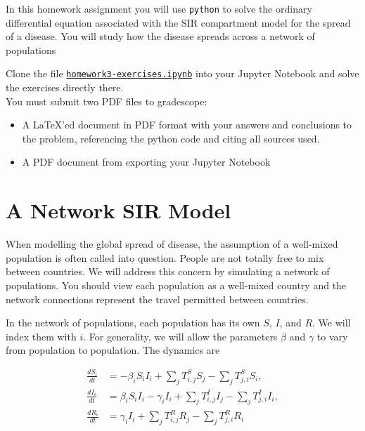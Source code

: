 \documentclass[letter]{article}
\newcommand{\setheader}[6]{
	\lhead{{\sc #1}\\{\sc #2}}%
	\rhead{
		{\bf #3} 
		\ifthenelse{\equal{#4}{}}{}{(#4)}\\
		{\bf #5} 
		\ifthenelse{\equal{#6}{}}{}{(#6)}%
	}
}
\begin{document}
	\setheader{APM348}{Homework 3}{Due: 5:59pm March 9}{}{}{}


In this homework assignment you will use \verb|python| to solve the ordinary differential equation associated with the SIR compartment model for the spread of a disease. You will study how the disease spreads across a network of populations

Clone the file \href{https://utoronto.syzygy.ca/jupyter/user-redirect/git-pull?repo=https://github.com/bigfatbernie/IBLMathModeling&subPath=homeworks/homework3/homework3-exercises.ipynb}{\tt homework3-exercises.ipynb} into your Jupyter Notebook and solve the exercises directly there. \\

You must submit two PDF files to gradescope:
\begin{itemize}
	\item A \LaTeX'ed document in PDF format with your answers and conclusions to the problem, referencing the python code and citing all sources used.
	\item A PDF document from exporting your Jupyter Notebook
\end{itemize}



\section{A Network SIR Model}


When modelling the global spread of disease, the assumption of a well-mixed population is often called into question. People are not totally free to mix between countries. We will address this concern by simulating a network of populations. You should view each population as a well-mixed country and the network connections represent the travel permitted between countries.


In the network of populations, each population has its own $S$, $I$, and $R$. We will index them with $i$. For generality, we will allow the parameters $\beta$ and $\gamma$ to vary from population to population. The dynamics are

\begin{align}
	\frac{dS_i}{dt} & = -\beta_i S_i I_i + \sum_{j} T^S_{i,j} S_j - \sum_j T^S_{j,i} S_i, \label{SIR:S}\\
	\frac{dI_i}{dt} & = 	\beta_i S_i I_i - \gamma_i I_i + \sum_{j} T^I_{i,j} I_j - \sum_j T^I_{j,i} I_i, \label{SIR:I} \\
	\frac{dR_i}{dt} & = \gamma_i I_i + \sum_{j} T^R_{i,j} R_j - \sum_j T^R_{j,i} R_i \label{SIR:R}
\end{align}
\end{document}
